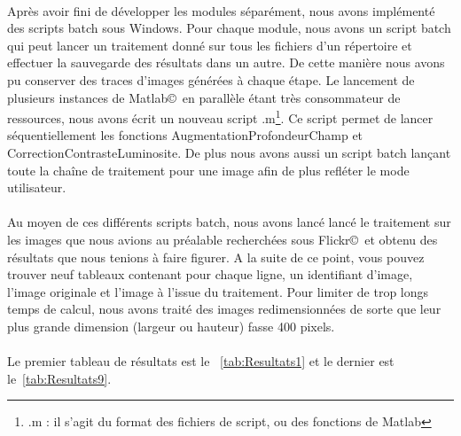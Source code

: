 \documentclass[11pt, french,screen]{report-rd-info}
\begin{document}
\paragraph*{}
Après avoir fini de développer les modules séparément, nous avons implémenté des scripts batch sous Windows. Pour chaque module, nous avons un script batch qui peut lancer un traitement donné sur tous les fichiers d'un répertoire et effectuer la sauvegarde des résultats dans un autre. De cette manière nous avons pu conserver des traces d'images générées à chaque étape. Le lancement de plusieurs instances de Matlab\copyright~en parallèle étant très consommateur de ressources, nous avons écrit un nouveau script .m\footnote{.m : il s'agit du format des fichiers de script, ou des fonctions de Matlab}. Ce script permet de lancer séquentiellement les fonctions AugmentationProfondeurChamp et CorrectionContrasteLuminosite. De plus nous avons aussi un script batch lançant toute la chaîne de traitement pour une image afin de plus refléter le mode utilisateur. 

\paragraph*{}
Au moyen de ces différents scripts batch, nous avons lancé lancé le traitement sur les images que nous avions au préalable recherchées sous Flickr\copyright~et obtenu des résultats que nous tenions à faire figurer. A la suite de ce point, vous pouvez trouver neuf tableaux contenant pour chaque ligne, un identifiant d'image, l'image originale et l'image à l'issue du traitement. Pour limiter de trop longs temps de calcul, nous avons traité des images redimensionnées de sorte que leur plus grande dimension (largeur ou hauteur) fasse 400 pixels.   

\paragraph*{}
Le premier tableau de résultats est le ~\ref{tab:Resultats1} et le dernier est le~\ref{tab:Resultats9}.
\end{document}
